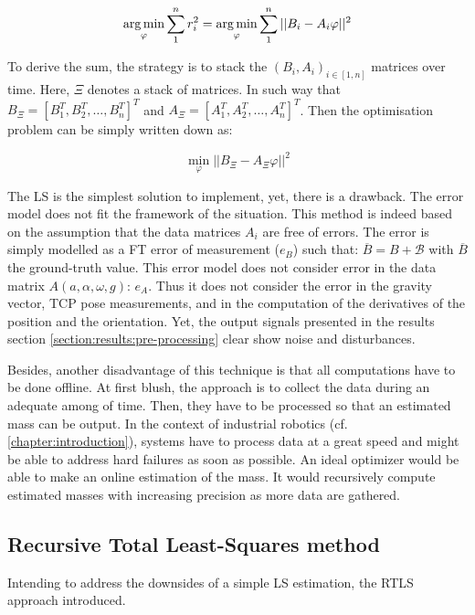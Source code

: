 \documentclass[/home/francois/latex/report/main.tex]{subfiles}
\begin{document}
\begin{equation}
  \operatorname*{arg\,min}_{\varphi} \sum_{1}^{n} r_i^2 = \operatorname*{arg\,min}_{\varphi} \sum_{1}^{n} ||B_i - A_i \varphi||^2
\end{equation}

To derive the sum, the strategy is to stack the $(B_i, A_i)_{i \in [1, n]}$ matrices over time. Here, $\Xi$ denotes a stack of matrices. In such way that $B_\Xi = [B_1^T, B_2^T, \ldots, B_n^T]^T$ and $A_\Xi = [A_1^T, A_2^T, \ldots, A_n^T]^T$. Then the optimisation problem can be simply written down as:

\begin{equation}
  \min_{\varphi} ||B_\Xi - A_\Xi \varphi||^2
\end{equation}

The \ac{LS} is the simplest solution to implement, yet, there is a drawback. The error model does not fit the framework of the situation. This method is indeed based on the assumption that the data matrices $A_i$ are free of errors. The error is simply modelled as a \ac{FT} error of measurement ($e_B$) such that: $\overline{B} = B + \mathcal{B}$ with $\overline{B}$ the ground-truth value. This error model does not consider error in the data matrix $A(a, \alpha, \omega, g)$: $e_A$. Thus it does not consider the error in the gravity vector, \ac{TCP} pose measurements, and in the computation of the derivatives of the position and the orientation. Yet, the output signals presented in the results section \ref{section:results:pre-processing} clear show noise and disturbances.

Besides, another disadvantage of this technique is that all computations have to be done offline. At first blush, the approach is to collect the data during an adequate among of time. Then, they have to be processed so that an estimated mass can be output. In the context of industrial robotics (cf. \ref{chapter:introduction}), systems have to process data at a great speed and might be able to address hard failures as soon as possible. An ideal optimizer would be able to make an online estimation of the mass. It would recursively compute estimated masses with increasing precision as more data are gathered.

\subsection{Recursive Total Least-Squares method}

Intending to address the downsides of a simple \ac{LS} estimation, the \ac{RTLS} approach introduced.
\end{document}

